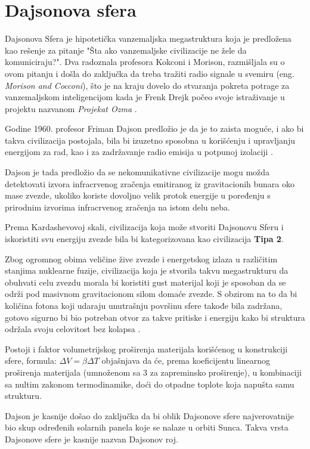 \documentclass[a4paper]{article}
\begin{document}
\section{Dajsonova sfera}
Dajsonova Sfera je hipotetička vanzemaljska megastruktura koja je predložena kao rešenje za pitanje "Šta ako vanzemaljske civilizacije ne žele da komuniciraju?". Dva radoznala profesora Kokconi i Morison, razmišljala su o ovom pitanju i došla do zaključka da treba tražiti radio signale u svemiru (eng. \emph{Morison and Cocconi}), što je na kraju dovelo do stvaranja pokreta potrage za vanzemaljskom inteligencijom kada je Frenk Drejk počeo svoje istraživanje u projektu nazvanom \emph{Projekat Ozma} \cite{firstpaper}.

Godine 1960. profesor Friman Dajson predložio je da je to zaista moguće, i ako bi takva civilizacija postojala, bila bi izuzetno sposobna u korišćenju i upravljanju energijom za rad, kao i za zadržavanje radio emisija u potpunoj izolaciji \cite{firstpaper}.

Dajson je tada predložio da se nekomunikativne civilizacije mogu možda detektovati izvora infracrvenog zračenja emitiranog iz gravitacionih bunara oko mase zvezde, ukoliko koriste dovoljno velik protok energije u poređenju s prirodnim izvorima infracrvenog zračenja na istom delu neba.

Prema Kardashevovoj skali, civilizacija koja može stvoriti Dajsonovu Sferu i iskoristiti svu energiju zvezde bila bi kategorizovana kao civilizacija \textbf{Tipa 2}.

Zbog ogromnog obima veličine žive zvezde i energetskog izlaza u različitim stanjima nuklearne fuzije, civilizacija koja je stvorila takvu megastrukturu da obuhvati celu zvezdu morala bi koristiti gust materijal koji je sposoban da se održi pod masivnom gravitacionom silom domaće zvezde. S obzirom na to da bi količina fotona koji udaraju unutrašnju površinu sfere takođe bila zadržana, gotovo sigurno bi bio potreban otvor za takve pritiske i energiju kako bi struktura održala svoju celovitost bez kolapsa \cite{dajsonstanf}.

Postoji i faktor volumetrijskog proširenja materijala korišćenog u konstrukciji sfere, formula: $\Delta V=\beta\Delta T$ objašnjava da će, prema koeficijentu linearnog proširenja materijala (umnoženom sa 3 za zapreminsko proširenje), u kombinaciji sa nultim zakonom termodinamike, doći do otpadne toplote koja napušta samu strukturu.

Dajson je kasnije došao do zaključka da bi oblik Dajsonove sfere najverovatnije bio skup određenih solarnih panela koje se nalaze u orbiti Sunca. Takva vrsta Dajsonove sfere je kasnije nazvan Dajsonov roj.
\end{document}
